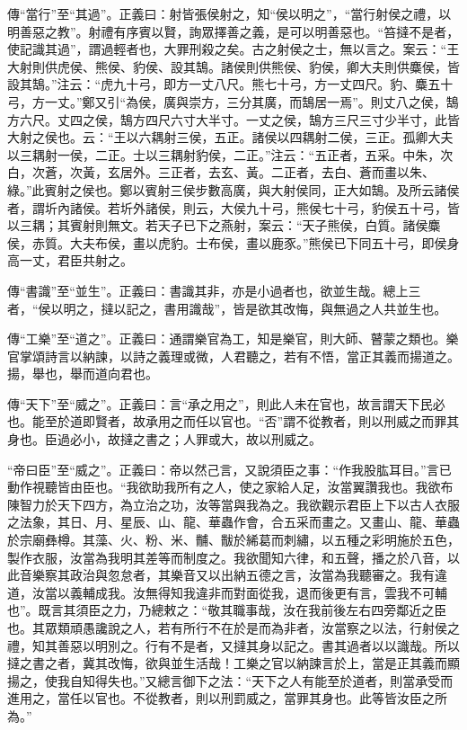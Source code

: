 {\noindent\zhuan{}\fzbyks 傳“當行”至“其過”。正義曰：射皆張侯射之，知“侯以明之”，“當行射侯之禮，以明善惡之教”。射禮有序賓以賢，詢眾擇善之義，是可以明善惡也。“笞撻不是者，使記識其過”，謂過輕者也，大罪刑殺之矣。古之射侯之士，無以言之。案云：“王大射則供虎侯、熊侯、豹侯、設其鵠。諸侯則供熊侯、豹侯，卿大夫則供麋侯，皆設其鵠。”注云：“虎九十弓，即方一丈八尺。熊七十弓，方一丈四尺。豹、麋五十弓，方一丈。”鄭又引“為侯，廣與崇方，三分其廣，而鵠居一焉”。則丈八之侯，鵠方六尺。丈四之侯，鵠方四尺六寸大半寸。一丈之侯，鵠方三尺三寸少半寸，此皆大射之侯也。云：“王以六耦射三侯，五正。諸侯以四耦射二侯，三正。孤卿大夫以三耦射一侯，二正。士以三耦射豹侯，二正。”注云：“五正者，五采。中朱，次白，次蒼，次黃，玄居外。三正者，去玄、黃。二正者，去白、蒼而畫以朱、綠。”此賓射之侯也。鄭以賓射三侯步數高廣，與大射侯同，正大如鵠。及所云諸侯者，謂圻內諸侯。若圻外諸侯，則云，大侯九十弓，熊侯七十弓，豹侯五十弓，皆以三耦；其賓射則無文。若天子已下之燕射，案云：“天子熊侯，白質。諸侯麋侯，赤質。大夫布侯，畫以虎豹。士布侯，畫以鹿豕。”熊侯已下同五十弓，即侯身高一丈，君臣共射之。 \par}

{\noindent\zhuan{}\fzbyks 傳“書識”至“並生”。正義曰：書識其非，亦是小過者也，欲並生哉。總上三者，“侯以明之，撻以記之，書用識哉”，皆是欲其改悔，與無過之人共並生也。 \par}

{\noindent\zhuan{}\fzbyks 傳“工樂”至“道之”。正義曰：通謂樂官為工，知是樂官，則大師、瞽蒙之類也。樂官掌頌詩言以納諫，以詩之義理或微，人君聽之，若有不悟，當正其義而揚道之。揚，舉也，舉而道向君也。 \par}

{\noindent\zhuan{}\fzbyks 傳“天下”至“威之”。正義曰：言“承之用之”，則此人未在官也，故言謂天下民必也。能至於道即賢者，故承用之而任以官也。“否”謂不從教者，則以刑威之而罪其身也。臣過必小，故撻之書之；人罪或大，故以刑威之。 \par}

{\noindent\shu{}\fzkt “帝曰臣”至“威之”。正義曰：帝以然己言，又說須臣之事：“作我股肱耳目。”言已動作視聽皆由臣也。“我欲助我所有之人，使之家給人足，汝當翼讚我也。我欲布陳智力於天下四方，為立治之功，汝等當與我為之。我欲觀示君臣上下以古人衣服之法象，其日、月、星辰、山、龍、華蟲作會，合五采而畫之。又畫山、龍、華蟲於宗廟彝樽。其藻、火、粉、米、黼、黻於絺葛而刺繡，以五種之彩明施於五色，製作衣服，汝當為我明其差等而制度之。我欲聞知六律，和五聲，播之於八音，以此音樂察其政治與忽怠者，其樂音又以出納五德之言，汝當為我聽審之。我有違道，汝當以義輔成我。汝無得知我違非而對面從我，退而後更有言，雲我不可輔也”。既言其須臣之力，乃總敕之：“敬其職事哉，汝在我前後左右四旁鄰近之臣也。其眾類頑愚讒說之人，若有所行不在於是而為非者，汝當察之以法，行射侯之禮，知其善惡以明別之。行有不是者，又撻其身以記之。書其過者以以識哉。所以撻之書之者，冀其改悔，欲與並生活哉！工樂之官以納諫言於上，當是正其義而顯揚之，使我自知得失也。”又總言御下之法：“天下之人有能至於道者，則當承受而進用之，當任以官也。不從教者，則以刑罰威之，當罪其身也。此等皆汝臣之所為。” \par}

